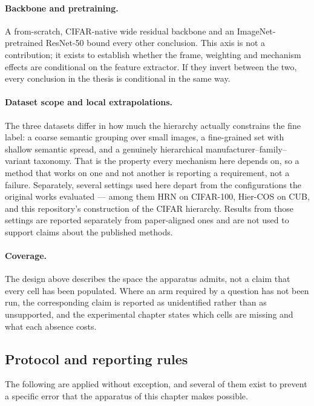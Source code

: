 \paragraph{Backbone and pretraining.} A from-scratch, CIFAR-native wide residual
backbone and an ImageNet-pretrained ResNet-50 bound every other conclusion. This
axis is not a contribution; it exists to establish whether the frame, weighting
and mechanism effects are conditional on the feature extractor. If they invert
between the two, every conclusion in the thesis is conditional in the same way.

\paragraph{Dataset scope and local extrapolations.} The three datasets differ in
how much the hierarchy actually constrains the fine label: a coarse semantic
grouping over small images, a fine-grained set with shallow semantic spread, and a
genuinely hierarchical manufacturer--family--variant taxonomy. That is the property
every mechanism here depends on, so a method that works on one and not another is
reporting a requirement, not a failure. Separately, several settings used here
depart from the configurations the original works evaluated --- among them HRN on
CIFAR-100, Hier-COS on CUB, and this repository's construction of the CIFAR
hierarchy. Results from those settings are reported separately from paper-aligned
ones and are not used to support claims about the published methods.

\paragraph{Coverage.} The design above describes the space the apparatus admits,
not a claim that every cell has been populated. Where an arm required by a
question has not been run, the corresponding claim is reported as unidentified
rather than as unsupported, and the experimental chapter states which cells are
missing and what each absence costs.

\subsection{Protocol and reporting rules}
\label{ssec:design_protocol}

The following are applied without exception, and several of them exist to prevent
a specific error that the apparatus of this chapter makes possible.

